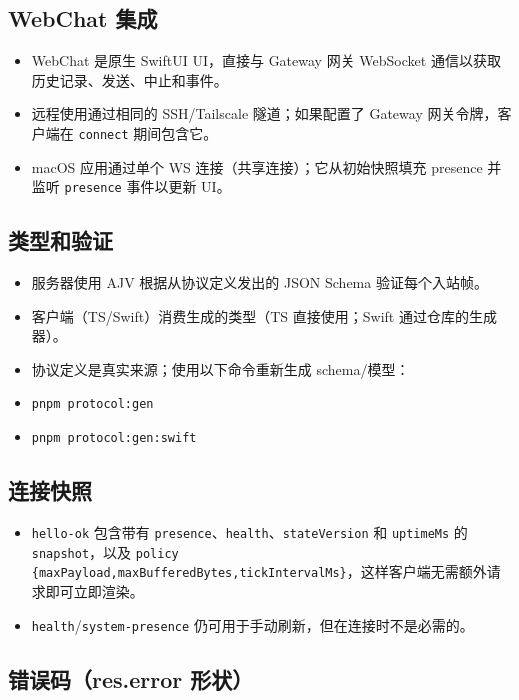 \subsection{WebChat 集成}


\begin{itemize}
  \item WebChat 是原生 SwiftUI UI，直接与 Gateway 网关 WebSocket 通信以获取历史记录、发送、中止和事件。
  \item 远程使用通过相同的 SSH/Tailscale 隧道；如果配置了 Gateway 网关令牌，客户端在 \texttt{connect} 期间包含它。
  \item macOS 应用通过单个 WS 连接（共享连接）；它从初始快照填充 presence 并监听 \texttt{presence} 事件以更新 UI。
\end{itemize}


\subsection{类型和验证}


\begin{itemize}
  \item 服务器使用 AJV 根据从协议定义发出的 JSON Schema 验证每个入站帧。
  \item 客户端（TS/Swift）消费生成的类型（TS 直接使用；Swift 通过仓库的生成器）。
  \item 协议定义是真实来源；使用以下命令重新生成 schema/模型：
  \item \texttt{pnpm protocol:gen}
  \item \texttt{pnpm protocol:gen:swift}
\end{itemize}


\subsection{连接快照}


\begin{itemize}
  \item \texttt{hello-ok} 包含带有 \texttt{presence}、\texttt{health}、\texttt{stateVersion} 和 \texttt{uptimeMs} 的 \texttt{snapshot}，以及 \texttt{policy \{maxPayload,maxBufferedBytes,tickIntervalMs\}}，这样客户端无需额外请求即可立即渲染。
  \item \texttt{health}/\texttt{system-presence} 仍可用于手动刷新，但在连接时不是必需的。
\end{itemize}


\subsection{错误码（res.error 形状）}


